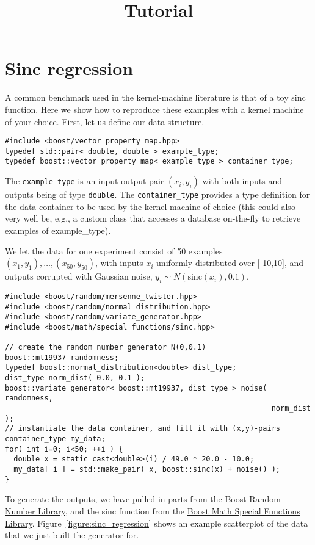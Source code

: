 \documentclass{article}
\begin{document}
\title{Tutorial}
\maketitle

\section*{Sinc regression}

A common benchmark used in the kernel-machine literature is that of a toy sinc function. 
Here we show how to reproduce these examples with a kernel machine of your choice. 
First, let us define our data structure.
%
\highlightcpp{}
\begin{verbatim}
#include <boost/vector_property_map.hpp>
typedef std::pair< double, double > example_type;
typedef boost::vector_property_map< example_type > container_type;
\end{verbatim}
%
The \texttt{example_type} is an input-output pair $(x_i,y_i)$ with both inputs and outputs being
of type \texttt{double}.
The \texttt{container_type} provides a type definition for the data container to
be used by the kernel machine of choice 
(this could also very well be, e.g., a custom class that 
accesses a database on-the-fly to retrieve examples of example_type).

We let the data for one experiment consist of 50 examples $(x_1,y_1),\ldots,(x_{50},y_{50})$,
with inputs $x_{i}$ uniformly distributed over [-10,10],
and outputs corrupted with Gaussian noise, $y_{i}\sim N(\mathrm{sinc}(x_{i}),0.1)$.
%
\highlightcpp{}
\begin{verbatim}
#include <boost/random/mersenne_twister.hpp>
#include <boost/random/normal_distribution.hpp>
#include <boost/random/variate_generator.hpp>
#include <boost/math/special_functions/sinc.hpp>

// create the random number generator N(0,0.1)
boost::mt19937 randomness;
typedef boost::normal_distribution<double> dist_type;
dist_type norm_dist( 0.0, 0.1 );
boost::variate_generator< boost::mt19937, dist_type > noise( randomness, 
                                                             norm_dist );
// instantiate the data container, and fill it with (x,y)-pairs
container_type my_data;
for( int i=0; i<50; ++i ) {
  double x = static_cast<double>(i) / 49.0 * 20.0 - 10.0;
  my_data[ i ] = std::make_pair( x, boost::sinc(x) + noise() );
}
\end{verbatim}
%
To generate the outputs, we have pulled in parts from the 
\href{http://www.boost.org/libs/random/index.html}{Boost Random Number Library}, and the
sinc function from the
\href{http://www.boost.org/libs/math/special_functions/index.html}{Boost Math Special Functions Library}. 
%
%
Figure~\ref{figure:sinc_regression} shows an example scatterplot of the data that we 
just built the generator for. 
\end{document}
